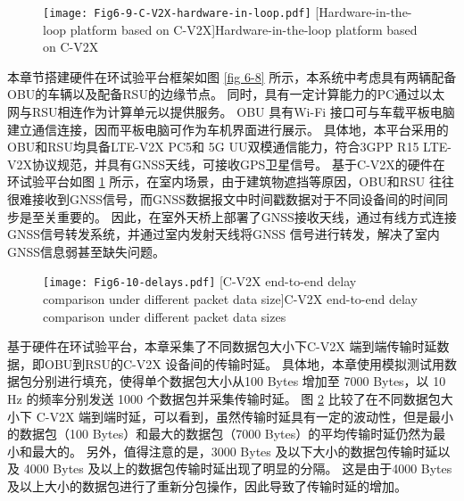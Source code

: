 \begin{figure}[h]
\centering
  \texttt{[image: Fig6-9-C-V2X-hardware-in-loop.pdf]}
  [Hardware-in-the-loop platform based on C-V2X]{Hardware-in-the-loop platform based on C-V2X}
  \label{fig 6-9}
\end{figure}

本章节搭建硬件在环试验平台框架如图 \ref{fig 6-8} 所示，本系统中考虑具有两辆配备OBU的车辆以及配备RSU的边缘节点。
同时，具有一定计算能力的PC通过以太网与RSU相连作为计算单元以提供服务。
OBU 具有Wi-Fi 接口可与车载平板电脑建立通信连接，因而平板电脑可作为车机界面进行展示。
具体地，本平台采用的OBU和RSU均具备LTE-V2X PC5和 5G UU双模通信能力，符合3GPP R15 LTE-V2X协议规范，并具有GNSS天线，可接收GPS卫星信号。
基于C-V2X的硬件在环试验平台如图 \ref{fig 6-9} 所示，在室内场景，由于建筑物遮挡等原因，OBU和RSU 往往很难接收到GNSS信号，而GNSS数据报文中时间戳数据对于不同设备间的时间同步是至关重要的。
因此，在室外天桥上部署了GNSS接收天线，通过有线方式连接GNSS信号转发系统，并通过室内发射天线将GNSS 信号进行转发，解决了室内GNSS信息弱甚至缺失问题。

\begin{figure}[h]
\centering
  \texttt{[image: Fig6-10-delays.pdf]}
  [C-V2X end-to-end delay comparison under different packet data size]{C-V2X end-to-end delay comparison under different packet data sizes}
  \label{fig 6-10}
\end{figure}

基于硬件在环试验平台，本章采集了不同数据包大小下C-V2X 端到端传输时延数据，即OBU到RSU的C-V2X 设备间的传输时延。
具体地，本章使用模拟测试用数据包分别进行填充，使得单个数据包大小从100 Bytes 增加至 7000 Bytes，以 10 Hz 的频率分别发送 1000 个数据包并采集传输时延。
图 \ref{fig 6-10} 比较了在不同数据包大小下 C-V2X 端到端时延，可以看到，虽然传输时延具有一定的波动性，但是最小的数据包（100 Bytes）和最大的数据包（7000 Bytes）的平均传输时延仍然为最小和最大的。
另外，值得注意的是，3000 Bytes 及以下大小的数据包传输时延以及 4000 Bytes 及以上的数据包传输时延出现了明显的分隔。
这是由于4000 Bytes 及以上大小的数据包进行了重新分包操作，因此导致了传输时延的增加。

